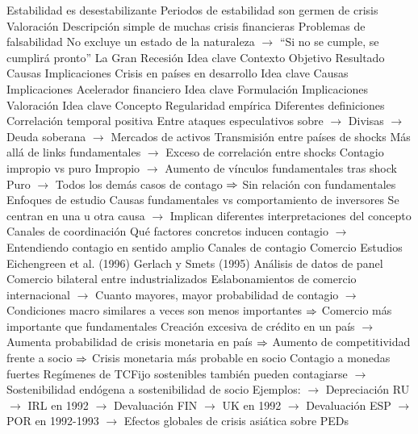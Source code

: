 \documentclass{nuevotema}
\begin{document}
\begin{esquemal}
				\4 Estabilidad es desestabilizante
				\4[] Periodos de estabilidad son germen de crisis
			\3 Valoración
				\4 Descripción simple de muchas crisis financieras
				\4 Problemas de falsabilidad
				\4[] No excluye un estado de la naturaleza
				\4[] $\to$ ``Si no se cumple, se cumplirá pronto''
		\2 La Gran Recesión
			\3 Idea clave
				\4 Contexto
				\4 Objetivo
				\4 Resultado
			\3 Causas
			\3 Implicaciones
		\2 Crisis en países en desarrollo
			\3 Idea clave
			\3 Causas
			\3 Implicaciones
		\2 Acelerador financiero
			\3 Idea clave
			\3 Formulación
			\3 Implicaciones
			\3 Valoración
	\1 
		\2 Idea clave
			\3 Concepto
				\4 Regularidad empírica
				\4 Diferentes definiciones
				\4 Correlación temporal positiva
				\4[] Entre ataques especulativos sobre
				\4[] $\to$ Divisas
				\4[] $\to$ Deuda soberana
				\4[] $\to$ Mercados de activos
				\4 Transmisión entre países de shocks
				\4[] Más allá de links fundamentales
				\4[] $\to$ Exceso de correlación entre shocks
				\4 Contagio impropio vs puro
				\4[] Impropio
				\4[] $\to$ Aumento de vínculos fundamentales tras shock
				\4[] Puro
				\4[] $\to$ Todos los demás casos de contago
				\4[] $\Rightarrow$ Sin relación con fundamentales
			\3 Enfoques de estudio
				\4 Causas fundamentales vs comportamiento de inversores
				\4[] Se centran en una u otra causa
				\4[] $\to$ Implican diferentes interpretaciones del concepto
				\4 Canales de coordinación
				\4[] Qué factores concretos inducen contagio
				\4[] $\to$ Entendiendo contagio en sentido amplio
		\2 Canales de contagio
			\3 Comercio
				\4 Estudios
				\4[] Eichengreen et al. (1996)
				\4[] Gerlach y Smets (1995)
				\4 Análisis de datos de panel
				\4[] Comercio bilateral entre industrializados
				\4 Eslabonamientos de comercio internacional
				\4[] $\to$ Cuanto mayores, mayor probabilidad de contagio
				\4[] $\to$ Condiciones macro similares a veces son menos importantes
				\4[] $\Rightarrow$ Comercio más importante que fundamentales
				\4 Creación excesiva de crédito en un país
				\4[] $\to$ Aumenta probabilidad de crisis monetaria en país
				\4[] $\Rightarrow$ Aumento de competitividad frente a socio
				\4[] $\Rightarrow$ Crisis monetaria más probable en socio
				\4 Contagio a monedas fuertes
				\4[] Regímenes de TCFijo sostenibles también pueden contagiarse
				\4[] $\to$ Sostenibilidad endógena a sostenibilidad de socio
				\4[] Ejemplos:
				\4[] $\to$ Depreciación RU $\to$ IRL en 1992
				\4[] $\to$ Devaluación FIN $\to$ UK en 1992
				\4[] $\to$ Devaluación ESP $\to$ POR en 1992-1993
				\4[] $\to$ Efectos globales de crisis asiática sobre PEDs

\end{esquemal}
\end{document}
